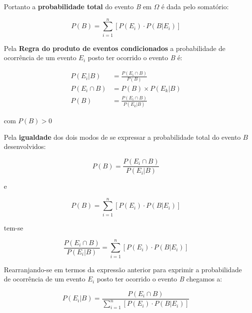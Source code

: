 \documentclass[
]{book}
\begin{document}
\hfill\break

Portanto a \textbf{probabilidade total} do evento \emph{B} em \(\Omega\) é dada pelo somatório:

\hfill\break

\[
P(B) = \sum _{i=1}^{n}\left[P\left({E}_{i}\right)\cdot P\left(B|{E}_{i}\right)\right]
\]

\hfill\break

Pela \textbf{Regra do produto de eventos condicionados} a probabilidade de ocorrência de um evento \(E_{i}\) posto ter ocorrido o evento \emph{B} é:

\hfill\break

\begin{align*}
P(E_{i}|B) & = \frac{P(E_{i} \cap B)}{P(B)} \\
P(E_{i} \cap B) & = P(B) \times P(E_{k}|B) \\
P(B) & = \frac{P(E_{i}\cap B)}{P(E_{k}|B)}
\end{align*}

\hfill\break

com \(P(B) > 0\)

\hfill\break

Pela \textbf{igualdade} dos dois modos de se expressar a probabilidade total do evento \(B\) desenvolvidos:

\hfill\break

\[
P(B) = \frac{P(E_{i}\cap B)}{P(E_{i}|B)}
\]

\hfill\break

e

\hfill\break

\[
P(B) = \sum _{i=1}^{n}\left[P\left({E}_{i}\right)\cdot P\left(B|{E}_{i}\right)\right]
\]

\hfill\break

tem-se

\hfill\break

\[
\frac{P(E_{i}\cap B)}{P(E_{i}|B)}=\sum _{i=1}^{n}\left[P\left({E}_{i}\right)\cdot P\left(B|{E}_{i}\right)\right]
\]

\hfill\break

Rearranjando-se em termos da expressão anterior para exprimir a probabilidade de ocorrência de um evento \(E_{i}\) posto ter ocorrido o evento \emph{B} chegamos a:

\hfill\break

\[
P(E_{i}|B) = \frac{P(E_{i}\cap B)}{\sum _{i=1}^{n}\left[P\left({E}_{i}\right)\cdot P\left(B|{E}_{i}\right)\right]}
\]

\hfill\break
\end{document}
